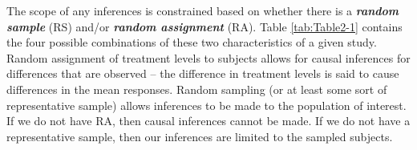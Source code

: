 \documentclass[
]{book}
\begin{document}
\indent The scope of any inferences is constrained based on whether there is a
\textbf{\emph{random sample}} (RS) and/or \textbf{\emph{random assignment}} (RA).   
Table \ref{tab:Table2-1} contains the four possible combinations of these
two characteristics of a given study. Random assignment of treatment levels to
subjects allows for causal
inferences for differences that are observed -- the difference in treatment
levels is said to cause differences in the mean responses. Random sampling (or
at least some sort of representative sample) allows inferences to be made to
the population of interest. If we do not have RA, then causal inferences cannot
be made. If we do not have a representative sample, then our inferences are
limited to the sampled subjects.
\end{document}
